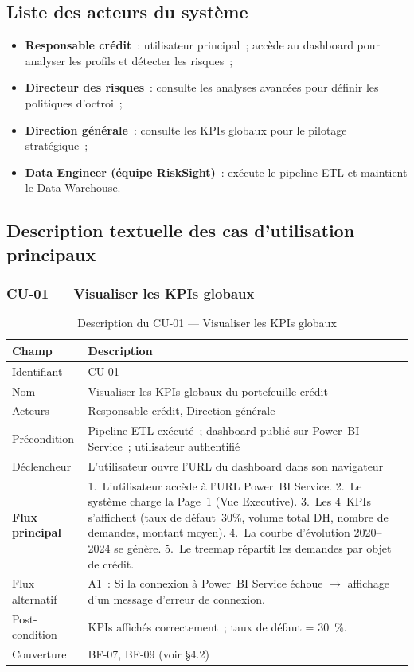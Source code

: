 \documentclass[12pt, a4paper]{report}
\begin{document}
\subsection{Liste des acteurs du système}

\begin{itemize}[leftmargin=1.5em]
  \item \textbf{Responsable crédit}~: utilisateur principal~; accède au dashboard
    pour analyser les profils et détecter les risques~;
  \item \textbf{Directeur des risques}~: consulte les analyses avancées pour
    définir les politiques d'octroi~;
  \item \textbf{Direction générale}~: consulte les KPIs globaux pour le pilotage
    stratégique~;
  \item \textbf{Data Engineer (équipe RiskSight)}~: exécute le pipeline ETL et
    maintient le Data Warehouse.
\end{itemize}

\subsection{Description textuelle des cas d'utilisation principaux}

\subsubsection{CU-01 --- Visualiser les KPIs globaux}

\begin{table}[H]
\centering
\caption{Description du CU-01 --- Visualiser les KPIs globaux}
\label{tab:cu01}
\renewcommand{\arraystretch}{1.3}
\begin{tabularx}{\textwidth}{p{3.5cm} X}
\toprule
\rowcolor{primary!12}
Champ & Description \\
\midrule
Identifiant      & CU-01 \\
Nom              & Visualiser les KPIs globaux du portefeuille crédit \\
Acteurs          & Responsable crédit, Direction générale \\
Précondition     & Pipeline ETL exécuté~; dashboard publié sur Power~BI Service~; utilisateur authentifié \\
Déclencheur      & L'utilisateur ouvre l'URL du dashboard dans son navigateur \\
\textbf{Flux principal} & 1.~L'utilisateur accède à l'URL Power~BI Service. 2.~Le système charge la Page~1 (Vue Executive). 3.~Les 4~KPIs s'affichent (taux de défaut~30\%, volume total DH, nombre de demandes, montant moyen). 4.~La courbe d'évolution 2020--2024 se génère. 5.~Le treemap répartit les demandes par objet de crédit. \\
Flux alternatif  & A1~: Si la connexion à Power~BI Service échoue $\to$ affichage d'un message d'erreur de connexion. \\
Post-condition   & KPIs affichés correctement~; taux de défaut = 30~\%. \\
Couverture       & BF-07, BF-09 (voir §4.2) \\
\bottomrule
\end{tabularx}
\end{table}
\end{document}
